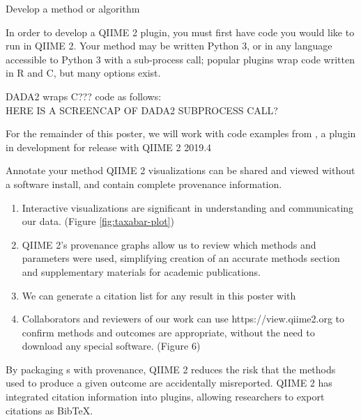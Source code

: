 \documentclass[final]{beamer}
\newlength{\colwidth}
\begin{document}
\begin{frame}[t]
\begin{columns}[t]
\begin{column}{\colwidth}
  \begin{block}{Develop a method or algorithm}

  In order to develop a QIIME 2 plugin, you must first have code you would
  like to run in QIIME 2. Your method may be written Python 3, or in any
  language accessible to Python 3 with a sub-process call; popular plugins wrap
  code written in R and C, but many options exist.
  \hfill\break

    \begin{tcolorbox}
    [width=\textwidth, colframe=blue]
      {DADA2 wraps C??? code as follows: \\
      HERE IS A SCREENCAP OF DADA2 SUBPROCESS CALL?}
    \end{tcolorbox}

  For the remainder of this poster, we will work with code examples from
  , a plugin in development for release with QIIME 2 2019.4
  \end{block}

  \begin{block}{Annotate your method}
    QIIME 2 visualizations can be shared and viewed without a software
    install, and contain complete provenance information.

    \begin{enumerate}
      \item Interactive visualizations are significant in understanding and
      communicating our data. (Figure \ref{fig:taxabar-plot})
      \item QIIME 2's provenance graphs allow us to review which methods and
      parameters were used, simplifying creation of an accurate methods section
      and supplementary materials for academic publications.
      \item We can generate a citation list for any result in this poster with 
      \item Collaborators and reviewers of our work can use https://view.qiime2.org to confirm methods and outcomes are
      appropriate, without the need to download any special software. (Figure 6)
    \end{enumerate}

  \begin{tcolorbox}
  [width=\textwidth, colframe=blue]
  {By packaging s with provenance, QIIME 2 reduces the risk that the
  methods used to produce a given outcome are accidentally misreported.
  QIIME 2 has integrated citation information into plugins, allowing
  researchers to export citations as BibTeX}.
  \end{tcolorbox}


\end{block}
\end{column}
\end{columns}
\end{frame}
\end{document}
